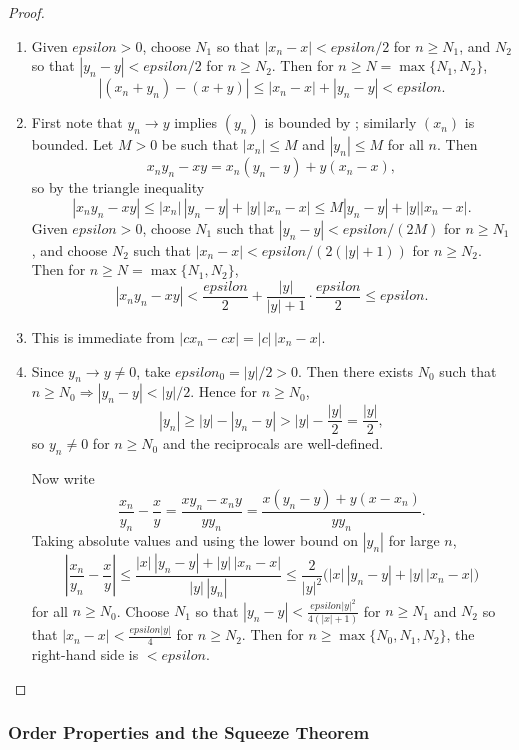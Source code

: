 \documentclass[12pt]{article}
\numberwithin{equation}{section}
\def\abs#1{|#1|}
\def\eps{epsilon}
\DeclarePairedDelimiter{\abs}{\lvert}{\rvert}
\newcommand{\eps}{\varepsilon}               %
\theoremstyle{plain}
\theoremstyle{definition}
\theoremstyle{remark}
\begin{document}
\begin{proof}
\begin{enumerate}[label=(\alph*)]
\item Given $\eps>0$, choose $N_1$ so that $\abs{x_n-x}<\eps/2$ for $n\ge N_1$, and $N_2$ so that $\abs{y_n-y}<\eps/2$ for $n\ge N_2$.
Then for $n\ge N=\max\{N_1,N_2\}$,
\[
\abs{(x_n+y_n)-(x+y)}\le \abs{x_n-x}+\abs{y_n-y}<\eps.
\]

\item First note that $y_n\to y$ implies $(y_n)$ is bounded by ; similarly $(x_n)$ is bounded.
Let $M>0$ be such that $\abs{x_n}\le M$ and $\abs{y_n}\le M$ for all $n$.
Then
\[
x_ny_n-xy = x_n(y_n-y) + y(x_n-x),
\]
so by the triangle inequality
\[
\abs{x_ny_n-xy}\le \abs{x_n}\,\abs{y_n-y} + \abs{y}\,\abs{x_n-x}
\le M\abs{y_n-y} + \abs{y}\abs{x_n-x}.
\]
Given $\eps>0$, choose $N_1$ such that $\abs{y_n-y}<\eps/(2M)$ for $n\ge N_1$, and choose $N_2$ such that $\abs{x_n-x}<\eps/(2(\abs{y}+1))$ for $n\ge N_2$.
Then for $n\ge N=\max\{N_1,N_2\}$,
\[
\abs{x_ny_n-xy} < \frac{\eps}{2} + \frac{\abs{y}}{\abs{y}+1}\cdot\frac{\eps}{2} \le \eps.
\]

\item This is immediate from $\abs{cx_n-cx}=\abs{c}\,\abs{x_n-x}$.

\item Since $y_n\to y\neq 0$, take $\eps_0=\abs{y}/2>0$. Then there exists $N_0$ such that $n\ge N_0\Rightarrow \abs{y_n-y}<\abs{y}/2$.
Hence for $n\ge N_0$,
\[
\abs{y_n}\ge \abs{y}-\abs{y_n-y}>\abs{y}-\frac{\abs{y}}{2}=\frac{\abs{y}}{2},
\]
so $y_n\neq 0$ for $n\ge N_0$ and the reciprocals are well-defined.

Now write
\[
\frac{x_n}{y_n}-\frac{x}{y}=\frac{xy_n-x_ny}{yy_n}=\frac{x(y_n-y)+y(x-x_n)}{yy_n}.
\]
Taking absolute values and using the lower bound on $\abs{y_n}$ for large $n$,
\[
\abs{\frac{x_n}{y_n}-\frac{x}{y}}
\le \frac{\abs{x}\,\abs{y_n-y}+\abs{y}\,\abs{x_n-x}}{\abs{y}\,\abs{y_n}}
\le \frac{2}{\abs{y}^2}\bigl(\abs{x}\,\abs{y_n-y}+\abs{y}\,\abs{x_n-x}\bigr)
\]
for all $n\ge N_0$.
Choose $N_1$ so that $\abs{y_n-y}<\frac{\eps\abs{y}^2}{4(\abs{x}+1)}$ for $n\ge N_1$ and $N_2$ so that $\abs{x_n-x}<\frac{\eps\abs{y}}{4}$ for $n\ge N_2$.
Then for $n\ge \max\{N_0,N_1,N_2\}$, the right-hand side is $<\eps$.
\end{enumerate}
\end{proof}

\subsubsection{Order Properties and the Squeeze Theorem}
\end{document}
